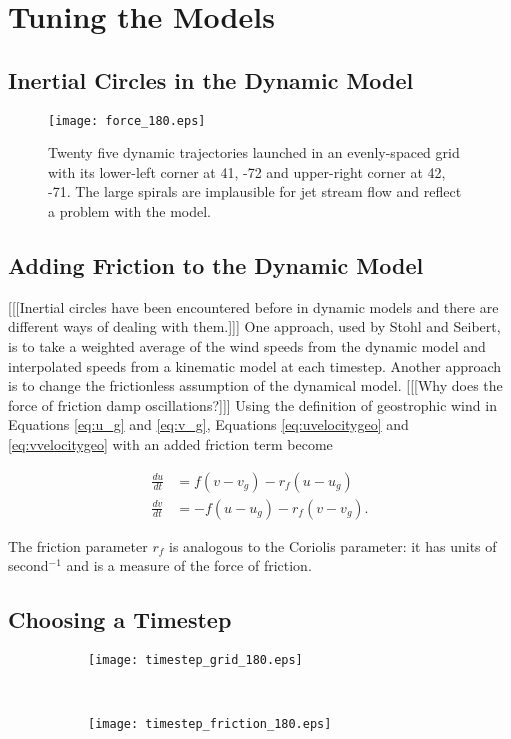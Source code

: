 \chapter{Tuning the Models}

\section{Inertial Circles in the Dynamic Model}

\begin{figure}
    \texttt{[image: force\_180.eps]}
    \caption{Twenty five dynamic trajectories launched in an evenly-spaced grid with its lower-left corner at 41, -72 and upper-right corner at 42, -71. 
    The large spirals are implausible for jet stream flow and reflect a problem with the model.}
    \label{fig:force_180}
\end{figure}

\section{Adding Friction to the Dynamic Model}

[[[Inertial circles have been encountered before in dynamic models and there are different ways of dealing with them.]]] \cite{stohl_accuracy_1998}
One approach, used by Stohl and Seibert, is to take a weighted average of the wind speeds from the dynamic model and interpolated speeds from a kinematic model at each timestep.
Another approach is to change the frictionless assumption of the dynamical model.
[[[Why does the force of friction damp oscillations?]]]
Using the definition of geostrophic wind in Equations \ref{eq:u_g} and \ref{eq:v_g}, Equations \ref{eq:uvelocitygeo} and \ref{eq:vvelocitygeo} with an added friction term become

\begin{align}
    \frac{du}{dt} &= f (v - v_g) - r_f (u - u_g) \\
    \frac{dv}{dt} &= -f (u - u_g) - r_f (v - v_g).   
\end{align}

The friction parameter $r_f$ is analogous to the Coriolis parameter: it has units of second$^{-1}$ and is a measure of the force of friction.

\section{Choosing a Timestep} \label{sec:timestep}

\begin{figure}[t!]
    \begin{subfigure}[t]{0.5\textwidth}
    	\texttt{[image: timestep\_grid\_180.eps]}
    \end{subfigure}
    ~
    \begin{subfigure}[t]{0.5\textwidth}
        \texttt{[image: timestep\_friction\_180.eps]}
    \end{subfigure}
\end{figure}
